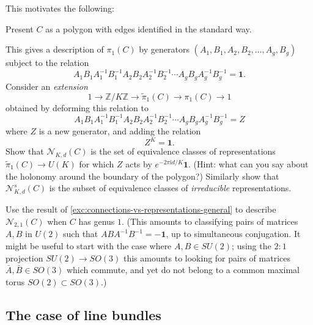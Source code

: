 \documentclass[12pt,letterpaper,reqno]{article}
\numberwithin{equation}{section}
\newcommand{\cN}{\ensuremath{\mathcal N}}
\newcommand{\Z}{\ensuremath{\mathbb Z}}
\newcommand{\I}{{\mathrm i}}
\newcommand\bid{{\mathbf 1}}
\newcommand{\ti}[1]{\textit{#1}}
\newcommand{\insfig}[2]{

\medskip
\noindent
\begin{minipage}{\linewidth}

\makebox[\linewidth]{\texttt{[image: figures/\#1-crop.pdf]}}

\end{minipage}
\medskip

}
\begin{document}
This motivates the following:
\begin{exercise} \label{exc:connections-vs-representations-general}
Present $C$ as a polygon with edges identified in the standard way.
\insfig{higgs-bundles-15}{1.1}
This gives a description of $\pi_1(C)$ by generators
$(A_1, B_1, A_2, B_2, \dots, A_g, B_g)$ subject to the relation
\begin{equation}
	A_1 B_1 A_1^{-1} B_1^{-1} A_2 B_2 A_2^{-1} B_2^{-1} \cdots A_g B_g A_g^{-1} B_g^{-1} = \bid.
\end{equation}
Consider an \ti{extension}
\begin{equation}
	1 \to \Z / K\Z \to \tilde \pi_1(C) \to \pi_1(C) \to 1
\end{equation}
obtained by deforming this relation to
\begin{equation}
	A_1 B_1 A_1^{-1} B_1^{-1} A_2 B_2 A_2^{-1} B_2^{-1} \cdots A_g B_g A_g^{-1} B_g^{-1} = Z
\end{equation}
where $Z$ is a new generator, and adding the relation
\begin{equation}
	Z^K = \bid.
\end{equation}
Show that $\cN_{K,d}(C)$ is the set of equivalence classes
of representations $\tilde \pi_1(C) \to U(K)$ for which
$Z$ acts by $e^{-2 \pi \I d / K} \bid$.
(Hint: what can you say about the
holonomy around the boundary of the polygon?)
Similarly show that $\cN^s_{K,d}(C)$ is the subset of equivalence
classes of \ti{irreducible} representations.
\end{exercise}

\begin{exercise} Use the result of \autoref{exc:connections-vs-representations-general}
to describe $\cN_{2,1}(C)$ when $C$ has genus $1$.
(This amounts to classifying pairs of matrices $A,B$ in $U(2)$ such that $ABA^{-1}B^{-1} = -\bid$,
up to simultaneous conjugation. It might be useful to start with the
case where $A,B \in SU(2)$; using the $2:1$ projection $SU(2) \to SO(3)$
this amounts to looking for pairs of matrices $\bar{A}, \bar{B} \in SO(3)$
which commute, and yet do not belong to a common maximal torus
$SO(2) \subset SO(3)$.)

\end{exercise}


\subsection{The case of line bundles} \label{sec:jacobians}
\end{document}
